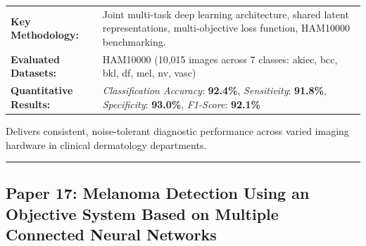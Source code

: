 \documentclass[10pt,a4paper]{article}
\begin{document}
\vspace{4pt}
\begin{tabularx}{\linewidth}{p{3.2cm}X}
\toprule
\textbf{Key Methodology:} & Joint multi-task deep learning architecture, shared latent representations, multi-objective loss function, HAM10000 benchmarking. \\
\textbf{Evaluated Datasets:} & HAM10000 (10,015 images across 7 classes: akiec, bcc, bkl, df, mel, nv, vasc) \\
\textbf{Quantitative Results:} & \textit{Classification Accuracy}: \textbf{92.4\%}, \textit{Sensitivity}: \textbf{91.8\%}, \textit{Specificity}: \textbf{93.0\%}, \textit{F1-Score}: \textbf{92.1\%} \\
\bottomrule
\end{tabularx}
\vspace{4pt}
\begin{tcolorbox}[utilitybox,title=Clinical Utility and Real-World Impact]
Delivers consistent, noise-tolerant diagnostic performance across varied imaging hardware in clinical dermatology departments.
\end{tcolorbox}
\vspace{12pt}
\hrule
\vspace{12pt}
\subsection*{Paper 17: Melanoma Detection Using an Objective System Based on Multiple Connected Neural Networks}
\end{document}
